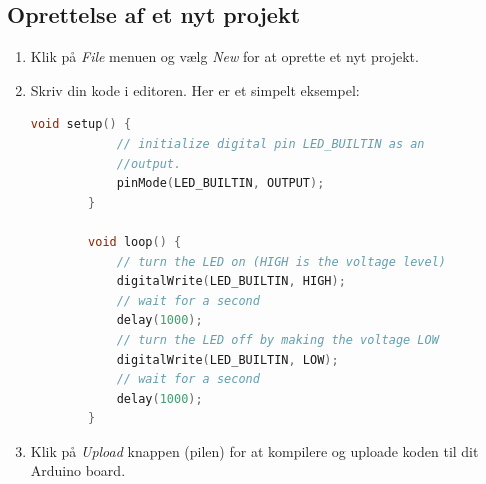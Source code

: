 \subsection{Oprettelse af et nyt projekt}
\begin{enumerate}[resume]
	\item Klik på \textit{File} menuen og vælg \textit{New} for at oprette et nyt projekt.
	\item Skriv din kode i editoren. Her er et simpelt eksempel:
	\begin{lstlisting}[language=C++]
		void setup() {
			// initialize digital pin LED_BUILTIN as an 
			//output.
			pinMode(LED_BUILTIN, OUTPUT);
		}
		
		void loop() {
			// turn the LED on (HIGH is the voltage level)
			digitalWrite(LED_BUILTIN, HIGH);
			// wait for a second
			delay(1000);
			// turn the LED off by making the voltage LOW
			digitalWrite(LED_BUILTIN, LOW);
			// wait for a second
			delay(1000);
		}
	\end{lstlisting}
	\item Klik på \textit{Upload} knappen (pilen) for at kompilere og uploade koden til dit Arduino board.
\end{enumerate}